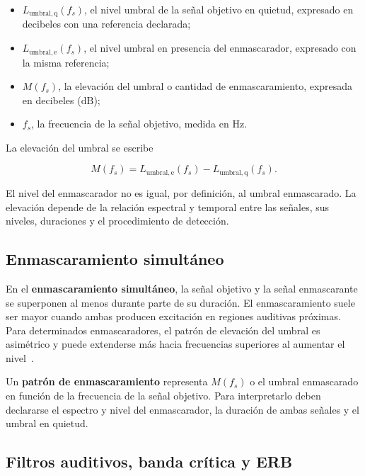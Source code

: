 \begin{itemize}
    \item \(L_{\mathrm{umbral,q}}(f_s)\), el nivel umbral de la señal objetivo
    en quietud, expresado en decibeles con una referencia declarada;
    \item \(L_{\mathrm{umbral,e}}(f_s)\), el nivel umbral en presencia del
    enmascarador, expresado con la misma referencia;
    \item \(M(f_s)\), la elevación del umbral o cantidad de enmascaramiento,
    expresada en decibeles (\(\text{dB}\));
    \item \(f_s\), la frecuencia de la señal objetivo, medida en
    \(\text{Hz}\).
\end{itemize}

La elevación del umbral se escribe

\begin{equation}
    M(f_s)
      =L_{\mathrm{umbral,e}}(f_s)
       -L_{\mathrm{umbral,q}}(f_s).
    \label{eq:u7-elevacion-umbral}
\end{equation}

El nivel del enmascarador no es igual, por definición, al umbral enmascarado.
La elevación depende de la relación espectral y temporal entre las señales,
sus niveles, duraciones y el procedimiento de detección.

\subsection{Enmascaramiento simultáneo}
\label{sec:u7-enmascaramiento-simultaneo}

En el \textbf{enmascaramiento simultáneo}, la señal objetivo y la señal
enmascarante se superponen al menos durante parte de su duración.
El enmascaramiento suele ser mayor cuando ambas producen excitación en
regiones auditivas próximas. Para determinados enmascaradores, el patrón de
elevación del umbral es asimétrico y puede extenderse más hacia frecuencias
superiores al aumentar el nivel~\cite{moore2008}.

Un \textbf{patrón de enmascaramiento} representa \(M(f_s)\) o el umbral
enmascarado en función de la frecuencia de la señal objetivo. Para
interpretarlo deben declararse el espectro y nivel del enmascarador, la
duración de ambas señales y el umbral en quietud.

\subsection{Filtros auditivos, banda crítica y ERB}
\label{sec:u7-filtros-auditivos}

